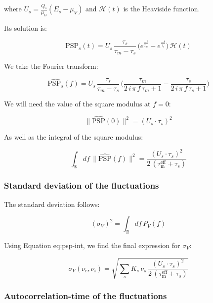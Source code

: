 \documentclass[8pt, colorlinks, a4paper]{article}
\renewcommand\ref{}
\begin{document}
where \( U_s = \frac{Q_s}{\mu_G} (E_s - \mu_V) \) and \(
\mathcal{H}(t) \) is the Heaviside function.

Its solution is:

\begin{equation}
\mathrm{PSP}_s(t)  = U_s \, \frac{\tau_s}{\tau_m - \tau_s} \, \big( 
e^{\frac{-t}{\tau_m}} - e^{\frac{-t}{\tau_s}} \big) \, \mathcal{H}(t)
\end{equation}

We take the Fourier transform:

\begin{equation}
\hat{\mathrm{PSP}_s}(f) = U_s \, \frac{\tau_s}{\tau_m - \tau_s} \, 
\big(
\frac{\tau_{m}}{2 \, i  \,  \pi \, f \, \tau_{m} +1} 
- \frac{\tau_s}{2 \, i  \,  \pi \, f \, \tau_s +1} \big)
\end{equation}

We will need the value of the square modulus at \(f=0\):

\begin{equation}
\label{eq:psp0}
\| \hat{\mathrm{PSP}}(0) \|^2 = (U_s \cdot \tau_s)^2
\end{equation}

As well as the integral of the square modulus:

\begin{equation}
\label{eq:psp-int}
\int_\mathbb{R}  df \, \| \hat{\mathrm{PSP}}(f) \|^2 = \frac{(U_s \cdot \tau_s)^2}{2 \, (\tau_\mathrm{m}^\mathrm{eff} + \tau_s ) }
\end{equation}

\subsubsection{Standard deviation of the fluctuations}
\label{sec-3-5-4}

The standard deviation follows:

\begin{equation}
 (\sigma_V)^2  = \int_\mathbb{R}  df \, P_V(f)
\end{equation}

Using Equation \ref{eq:psp-int}, we find the final expression for \(\sigma_V\):

\begin{equation}
\label{eq:sigma-v}
 \sigma_V(\nu_e, \nu_i)  = \sqrt{ \sum_s K_s \, \nu_s \, \frac{(U_s \cdot \tau_s)^2}{2 \, (\tau_\mathrm{m}^\mathrm{eff} + \tau_s ) } }
\end{equation}

\subsubsection{Autocorrelation-time of the fluctuations}
\label{sec-3-5-5}
\end{document}
